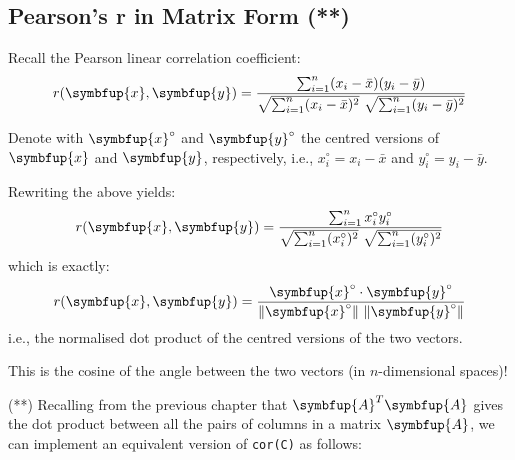 \documentclass[10pt,b5paper,krantz1]{krantz}
\newenvironment{Shaded}{\begin{snugshade}}{\end{snugshade}}
\newcommand{\ControlFlowTok}[1]{\textcolor[rgb]{0.27,0.27,0.27}{\textbf{#1}}}
\newcommand{\DecValTok}[1]{\textcolor[rgb]{0.06,0.06,0.06}{#1}}
\newcommand{\KeywordTok}[1]{\textcolor[rgb]{0.27,0.27,0.27}{\textbf{#1}}}
\newcommand{\NormalTok}[1]{#1}
\newcommand{\OperatorTok}[1]{\textcolor[rgb]{0.43,0.43,0.43}{\textbf{#1}}}
\newcommand{\StringTok}[1]{\textcolor[rgb]{0.5,0.5,0.5}{#1}}
\renewcommand{\mathbf}[1]{\symbfup{#1}}
\renewcommand{\boldsymbol}[1]{\symbfup{#1}}
\begin{document}
\hypertarget{pearsons-r-in-matrix-form}{%
\subsection{Pearson's r in Matrix Form (**)}\label{pearsons-r-in-matrix-form}}

Recall the Pearson linear correlation coefficient:
\[
r(\boldsymbol{x},\boldsymbol{y}) = \frac{
    \sum_{i=1}^n (x_i-\bar{x}) (y_i-\bar{y})
}{
    \sqrt{\sum_{i=1}^n (x_i-\bar{x})^2}\ \sqrt{\sum_{i=1}^n (y_i-\bar{y})^2}
}
\]

Denote with \(\boldsymbol{x}^\circ\) and \(\boldsymbol{y}^\circ\) the centred versions
of \(\boldsymbol{x}\) and \(\boldsymbol{y}\), respectively,
i.e., \(x_i^\circ=x_i-\bar{x}\) and \(y_i^\circ=y_i-\bar{y}\).

Rewriting the above yields:
\[
r(\boldsymbol{x},\boldsymbol{y}) = \frac{
    \sum_{i=1}^n x_i^\circ y_i^\circ
}{
    \sqrt{\sum_{i=1}^n ({x_i^\circ})^2}\  \sqrt{\sum_{i=1}^n ({y_i^\circ})^2}
}
\]
which is exactly:
\[
r(\boldsymbol{x},\boldsymbol{y}) = \frac{
    \boldsymbol{x}^\circ\cdot \boldsymbol{y}^\circ
}{
    \| \boldsymbol{x}^\circ \|\    \| \boldsymbol{y}^\circ \|
}
\]
i.e., the normalised dot product of the centred versions of the two vectors.

This is the cosine of the angle between the two vectors
(in \(n\)-dimensional spaces)!

(**) Recalling from the previous chapter that \(\mathbf{A}^T \mathbf{A}\)
gives the dot product between all the pairs of columns in a matrix \(\mathbf{A}\),
we can implement an equivalent version of \texttt{cor(C)} as follows:

\begin{Shaded}
\end{Shaded}
\end{document}
